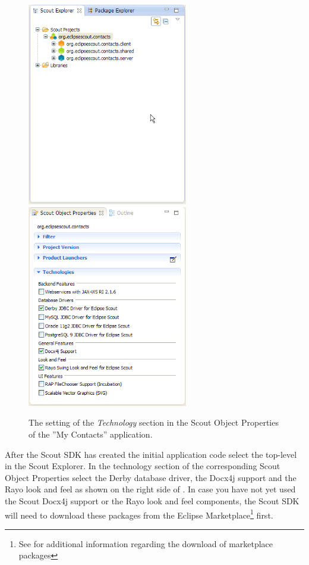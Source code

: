 \documentclass[a4paper,10pt,twoside]{book}
\begin{document}
\begin{figure}
\includegraphics[width=7cm]{project_contacts_explorer.png} \hspace{5mm}
\includegraphics[width=7cm]{project_contacts_properties.png}
\caption{The setting of the \textit{Technology} section in the Scout Object Properties of the ''My Contacts'' application.}
\end{figure}

After the Scout SDK has created the initial application code select the top-level  in the Scout Explorer. 
In the technology section of the corresponding Scout Object Properties select the Derby database driver, the Docx4j support and the Rayo look and feel as shown on the right side of .
In case you have not yet used the Scout Docx4j support or the Rayo look and feel components, the Scout SDK will need to download these packages from the Eclipse Marketplace\footnote{
See  for additional information regarding the download of marketplace packages
}
first. 
\end{document}
